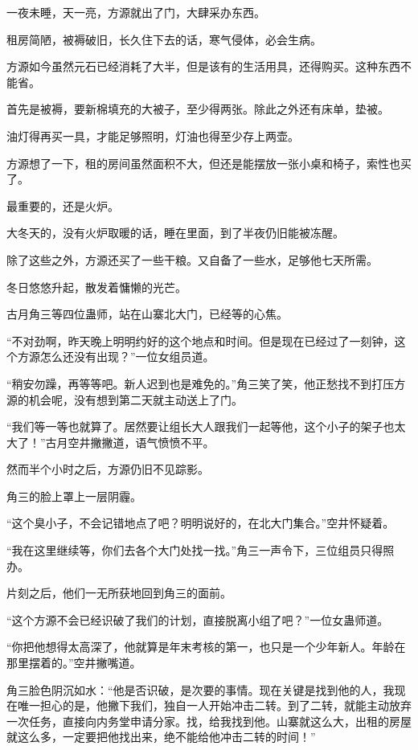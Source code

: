 
\begin{this_body}

一夜未睡，天一亮，方源就出了门，大肆采办东西。

租房简陋，被褥破旧，长久住下去的话，寒气侵体，必会生病。

方源如今虽然元石已经消耗了大半，但是该有的生活用具，还得购买。这种东西不能省。

首先是被褥，要新棉填充的大被子，至少得两张。除此之外还有床单，垫被。

油灯得再买一具，才能足够照明，灯油也得至少存上两壶。

方源想了一下，租的房间虽然面积不大，但还是能摆放一张小桌和椅子，索性也买了。

最重要的，还是火炉。

大冬天的，没有火炉取暖的话，睡在里面，到了半夜仍旧能被冻醒。

除了这些之外，方源还买了一些干粮。又自备了一些水，足够他七天所需。

冬日悠悠升起，散发着慵懒的光芒。

古月角三等四位蛊师，站在山寨北大门，已经等的心焦。

“不对劲啊，昨天晚上明明约好的这个地点和时间。但是现在已经过了一刻钟，这个方源怎么还没有出现？”一位女组员道。

“稍安勿躁，再等等吧。新人迟到也是难免的。”角三笑了笑，他正愁找不到打压方源的机会呢，没有想到第二天就主动送上了门。

“我们等一等也就算了。居然要让组长大人跟我们一起等他，这个小子的架子也太大了！”古月空井撇撇道，语气愤愤不平。

然而半个小时之后，方源仍旧不见踪影。

角三的脸上罩上一层阴霾。

“这个臭小子，不会记错地点了吧？明明说好的，在北大门集合。”空井怀疑着。

“我在这里继续等，你们去各个大门处找一找。”角三一声令下，三位组员只得照办。

片刻之后，他们一无所获地回到角三的面前。

“这个方源不会已经识破了我们的计划，直接脱离小组了吧？”一位女蛊师道。

“你把他想得太高深了，他就算是年末考核的第一，也只是一个少年新人。年龄在那里摆着的。”空井撇嘴道。

角三脸色阴沉如水：“他是否识破，是次要的事情。现在关键是找到他的人，我现在唯一担心的是，他撇下我们，独自一人开始冲击二转。到了二转，就能主动放弃一次任务，直接向内务堂申请分家。找，给我找到他。山寨就这么大，出租的房屋就这么多，一定要把他找出来，绝不能给他冲击二转的时间！”


\end{this_body}
